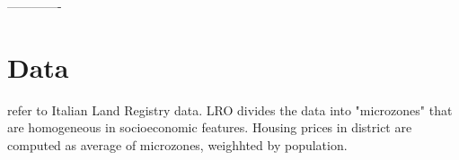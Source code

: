 \documentclass[12pt,a4paper]{article}
\begin{document}
-------------
\section{Data}

\cite{accetturo2014don} refer to Italian Land Registry data. LRO divides the data into "microzones" that are homogeneous in socioeconomic features. Housing prices in district are computed as average of microzones, weighhted by population. 












\newpage
\printbibliography
\end{document}
